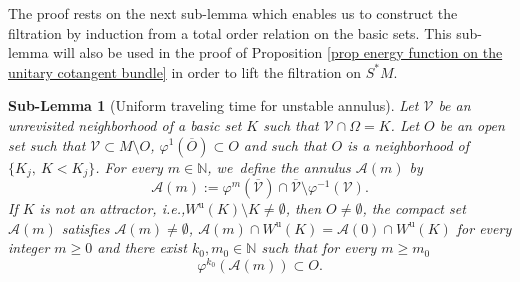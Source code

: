 \documentclass[11pt]{article}
\newcommand{\ie}{i.e.,\xspace}
\newcommand{\ru}{\mathrm{u}}
\theoremstyle{definition}
\theoremstyle{plain}
\newtheorem{sublemma}[definition]{Sub-Lemma}
\newcommand{\Acal}{\mathcal{A}}
\newcommand{\N}{\mathbb{N}}
\newcommand{\Vcal}{\mathcal{V}}
\begin{document}
The proof rests on the next sub-lemma which enables us to construct the filtration by induction from a total order relation on the basic sets. This sub-lemma will also be used in the proof of Proposition \ref{prop energy function on the unitary cotangent bundle} in order to lift the filtration on $S^* M$.

\begin{sublemma}[Uniform traveling time for unstable annulus]\label{Sublemma: uniform traveling time for unstable annulus}
Let $\Vcal$ be an unrevisited neighborhood of a basic set $K$ such that $\Vcal \cap \Omega = K$. Let $O$ be an open set such that $\Vcal \subset M\setminus O$, $\varphi^1 (\overline{O}) \subset O$ and such that $O$ is a neighborhood of $\{K_j, \: K < K_j \}$. For every $m \in \N$, we~define the \textit{annulus} $\Acal (m)$ by
\[
\Acal (m):= \varphi^m (\overline{\Vcal}) \cap \overline{\Vcal} \setminus \varphi^{-1}(\Vcal).
\]
If $K$ is not an attractor, \ie $W^\ru (K) \setminus K \neq \emptyset$, then $O \neq \emptyset$, the compact set $\Acal (m)$ satisfies $\Acal (m) \neq \emptyset$, $\Acal(m) \cap W^\ru (K) = \Acal(0) \cap W^\ru (K)$ for every integer $m \geq 0$ and
there exist $k_0, m_0 \in \N$ such that for every $m\geq m_0$
\[
\varphi^{k_0} \left(\Acal (m) \right) \subset O.
\]
\end{sublemma}
\end{document}
